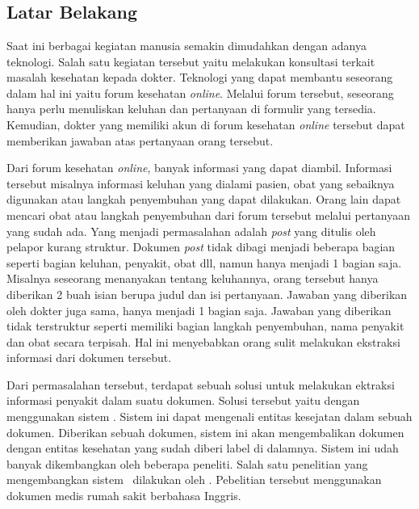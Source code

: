 \chapter{\babSatu}


\section{Latar Belakang}
	
	Saat ini berbagai kegiatan manusia semakin dimudahkan dengan adanya teknologi. Salah satu kegiatan tersebut yaitu melakukan konsultasi terkait masalah kesehatan kepada dokter. Teknologi yang dapat membantu seseorang dalam hal ini yaitu  forum kesehatan \textit{online}. Melalui forum tersebut, seseorang hanya perlu menuliskan keluhan dan pertanyaan di formulir yang tersedia. Kemudian, dokter yang memiliki akun di forum kesehatan \textit{online} tersebut dapat memberikan jawaban atas pertanyaan orang tersebut.
	
	Dari forum kesehatan \textit{online}, banyak informasi yang dapat diambil. Informasi tersebut misalnya informasi keluhan yang dialami pasien, obat yang sebaiknya digunakan atau langkah penyembuhan yang dapat dilakukan. Orang lain dapat mencari obat atau langkah penyembuhan dari forum tersebut melalui pertanyaan yang sudah ada. Yang menjadi permasalahan adalah \textit{post} yang ditulis oleh pelapor kurang struktur. Dokumen \textit{post} tidak dibagi menjadi beberapa bagian seperti bagian keluhan, penyakit, obat dll, namun hanya menjadi 1 bagian saja. Misalnya seseorang menanyakan tentang keluhannya, orang tersebut hanya diberikan 2 buah isian berupa judul dan isi pertanyaan. Jawaban yang diberikan oleh dokter juga sama, hanya menjadi 1 bagian saja. Jawaban yang diberikan tidak terstruktur seperti memiliki bagian langkah penyembuhan, nama penyakit dan obat secara terpisah. Hal ini menyebabkan orang sulit melakukan ekstraksi informasi dari dokumen tersebut.
	
	Dari permasalahan tersebut, terdapat sebuah solusi untuk melakukan ektraksi informasi penyakit dalam suatu dokumen. Solusi tersebut yaitu dengan menggunakan sistem \mer. Sistem ini dapat mengenali entitas kesejatan dalam sebuah dokumen. Diberikan sebuah dokumen, sistem ini akan mengembalikan dokumen dengan entitas kesehatan yang sudah diberi label di dalamnya. Sistem ini udah banyak dikembangkan oleh beberapa peneliti. Salah satu penelitian yang mengembangkan sistem \mer~dilakukan oleh \cite{abacha2011medical}. Pebelitian tersebut menggunakan dokumen medis rumah sakit berbahasa Inggris. 
		
